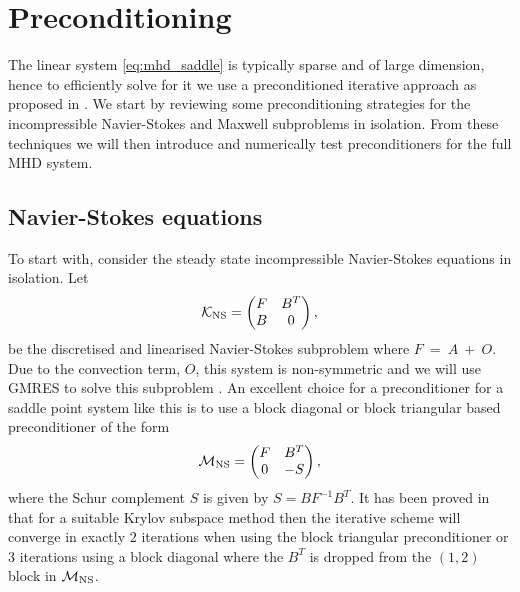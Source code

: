
\chapter{Preconditioning}
\label{chap:precond}





The linear system \eqref{eq:mhd_saddle} is typically sparse and of large dimension, hence to efficiently solve for it we use a preconditioned iterative approach as proposed in \cite{li2010numerical}. We start by reviewing some preconditioning strategies for the incompressible Navier-Stokes and Maxwell subproblems in isolation. From these techniques we will then introduce and  numerically test  preconditioners for the full MHD system.

\section{Navier-Stokes equations}
\label{sec:NSprecond}


To start with, consider the steady state incompressible Navier-Stokes equations in isolation. Let
\begin{equation}
\label{eq:ns_coeff}
\mathcal{K}_{\rm NS}=
\begin{pmatrix}
F & B^T \\
B & 0
\end{pmatrix},
\end{equation}
be the discretised and linearised Navier-Stokes subproblem where $F~=~A~+~O$. Due to the convection term, $O$, this  system is non-symmetric and we will use GMRES to solve this subproblem \cite{saad1986gmres}. An excellent choice for a preconditioner for a saddle point system like this is to use a block diagonal or block triangular based preconditioner of the form
\begin{equation}
\label{eq:ns_pc_upper}
\mathcal{M}_{\rm NS} =
\begin{pmatrix}
F & B^T \\
0 & -S
\end{pmatrix},
\end{equation}
where the Schur complement $S$ is given by $S=B F^{-1} B^T$. It has been proved in \cite{murphy2000note} that for a suitable Krylov subspace method then the iterative scheme will converge in exactly $2$ iterations when using the block triangular preconditioner or $3$ iterations using a block diagonal where the $B^T$ is dropped from the $(1,2)$ block in $\mathcal{M}_{\rm NS}$.

